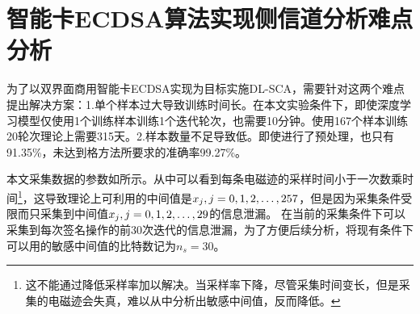 {	%
	
	
	\section{智能卡ECDSA算法实现侧信道分析难点分析}\label{sec:hardpoint}
	为了以双界面商用智能卡ECDSA实现为目标实施DL-SCA，需要针对这两个难点提出解决方案：1.单个样本过大导致训练时间长。在本文实验条件下，即使深度学习模型仅使用1个训练样本训练1个迭代轮次，也需要10分钟。使用167个样本训练20轮次理论上需要315天。2.样本数量不足导致\zyx 低。即使进行了预处理，\zyx 也只有91.35\%，未达到格方法所要求的准确率99.27\%。
	
	本文采集数据的参数如所示。从中可以看到每条电磁迹的采样时间小于一次数乘时间\footnote{这不能通过降低采样率加以解决。当采样率下降，尽管采集时间变长，但是采集的电磁迹会失真，难以从中分析出敏感中间值，反而降低\zyx 。}，这导致理论上可利用的中间值是$x_j,j=0,1,2,\dots,257$，但是因为采集条件受限而只采集到中间值$x_j,j=0,1,2,\dots,29$的信息泄漏。%
	在当前的采集条件下可以采集到每次签名操作的前30次迭代的信息泄漏，为了方便后续分析，将现有条件下可以用的敏感中间值的比特数记为$n_s=30$。
	
	
	
}
